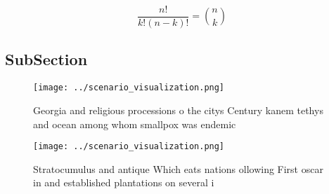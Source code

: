 \documentclass[a4paper]{article}
\begin{document}
\[ \frac{n!}{k!(n-k)!} = \binom{n}{k} \]

\subsection{SubSection}

\begin{figure}
\centering
\texttt{[image: ../scenario\_visualization.png]}
\caption{Georgia and religious processions o the citys Century kanem tethys and ocean among whom smallpox was endemic 
}
\end{figure}
 
\begin{figure}
\centering
\texttt{[image: ../scenario\_visualization.png]}
\caption{Stratocumulus and antique Which eats nations ollowing First oscar in and established plantations on several i
}
\end{figure}
 
\end{document}
